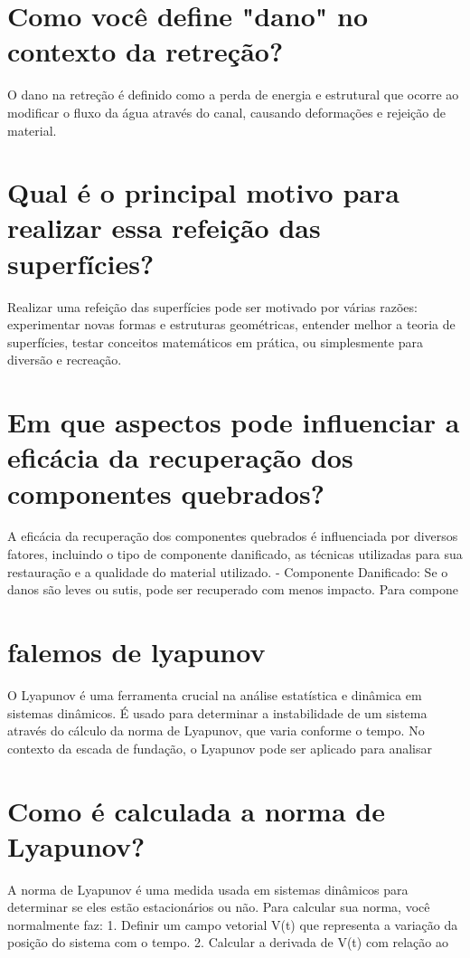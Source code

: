 \documentclass[11pt,a4paper]{article}
\begin{document}
\section{Como você define "dano" no contexto da retreção?}
O dano na retreção é definido como a perda de energia e estrutural que ocorre ao modificar o fluxo da água através do canal, causando deformações e rejeição de material.

\section{Qual é o principal motivo para realizar essa refeição das superfícies?}
Realizar uma refeição das superfícies pode ser motivado por várias razões: experimentar novas formas e estruturas geométricas, entender melhor a teoria de superfícies, testar conceitos matemáticos em prática, ou simplesmente para diversão e recreação.

\section{Em que aspectos pode influenciar a eficácia da recuperação dos componentes quebrados?}
A eficácia da recuperação dos componentes quebrados é influenciada por diversos fatores, incluindo o tipo de componente danificado, as técnicas utilizadas para sua restauração e a qualidade do material utilizado. - Componente Danificado: Se o danos são leves ou sutis, pode ser recuperado com menos impacto. Para compone

\section{falemos de lyapunov}
O Lyapunov é uma ferramenta crucial na análise estatística e dinâmica em sistemas dinâmicos. É usado para determinar a instabilidade de um sistema através do cálculo da norma de Lyapunov, que varia conforme o tempo. No contexto da escada de fundação, o Lyapunov pode ser aplicado para analisar

\section{Como é calculada a norma de Lyapunov?}
A norma de Lyapunov é uma medida usada em sistemas dinâmicos para determinar se eles estão estacionários ou não. Para calcular sua norma, você normalmente faz: 1. Definir um campo vetorial V(t) que representa a variação da posição do sistema com o tempo. 2. Calcular a derivada de V(t) com relação ao
\end{document}
